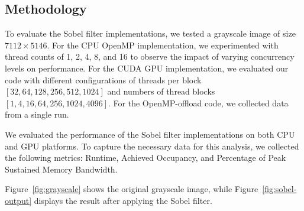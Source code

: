 \subsection{Methodology}
\label{subsec:methodology}

To evaluate the Sobel filter implementations, we tested a grayscale image of size \(7112 \times 5146\). For the CPU OpenMP implementation, we experimented with thread counts of 1, 2, 4, 8, and 16 to observe the impact of varying concurrency levels on performance. For the CUDA GPU implementation, we evaluated our code with different configurations of threads per block \([32, 64, 128, 256, 512, 1024]\) and numbers of thread blocks \([1, 4, 16, 64, 256, 1024, 4096]\). For the OpenMP-offload code, we collected data from a single run.

We evaluated the performance of the Sobel filter implementations on both CPU and GPU platforms. To capture the necessary data for this analysis, we collected the following metrics: Runtime, Achieved Occupancy, and Percentage of Peak Sustained Memory Bandwidth.

Figure~\ref{fig:grayscale} shows the original grayscale image, while Figure~\ref{fig:sobel-output} displays the result after applying the Sobel filter.

